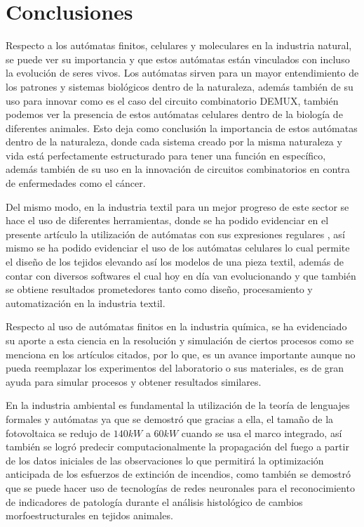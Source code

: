 \documentclass[10pt,conference]{IEEEtran}
\begin{document}
\section{\textbf{Conclusiones}}
    Respecto a los autómatas finitos, celulares y moleculares en la industria natural, se puede ver su importancia y que estos autómatas están vinculados con incluso la evolución de seres vivos. Los autómatas sirven para un mayor entendimiento de los patrones y sistemas biológicos dentro de la naturaleza, además también de su uso para innovar como es el caso del circuito combinatorio DEMUX, también podemos ver la presencia de estos autómatas celulares dentro de la biología de diferentes animales. Esto deja como conclusión la importancia de estos autómatas dentro de la naturaleza, donde cada sistema creado por la misma naturaleza y vida está perfectamente estructurado para tener una función en específico, además también de su uso en la innovación de circuitos combinatorios en contra de enfermedades como el cáncer.
    
    Del mismo modo, en la industria textil para un mejor progreso de este sector se hace el uso de diferentes herramientas, donde se ha podido evidenciar en el presente artículo la utilización de autómatas con sus expresiones regulares , así mismo se ha podido evidenciar el uso de los autómatas celulares  lo cual permite el diseño de los tejidos elevando así los modelos de una pieza textil, además de contar con diversos softwares el cual hoy en día van evolucionando y que también se obtiene resultados prometedores tanto como diseño, procesamiento y automatización en la industria textil.

    Respecto al uso de autómatas finitos en la industria química, se ha evidenciado su aporte a esta ciencia en la resolución y simulación de ciertos procesos como se menciona en los  artículos citados, por lo que, es un avance importante aunque no pueda reemplazar los experimentos del laboratorio o sus materiales, es de gran ayuda para simular procesos y obtener resultados similares.

    En la industria ambiental es fundamental la utilización de la teoría de lenguajes formales y autómatas ya que se demostró que gracias a ella,  el tamaño de la fotovoltaica se redujo de $140 kW$ a $60 kW$ cuando se usa el marco integrado, así también se logró predecir computacionalmente la propagación del fuego a partir de los datos iniciales de las observaciones lo que permitirá la optimización anticipada de los esfuerzos de extinción de incendios, como también se demostró que se puede hacer uso de tecnologías de redes neuronales para el reconocimiento de indicadores de patología durante el análisis histológico de cambios morfoestructurales en tejidos animales.
    
\end{document}
